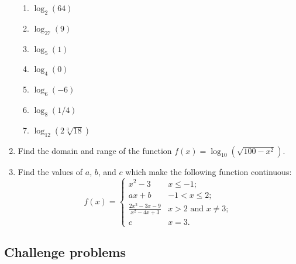 \begin{enumerate}
\begin{enumerate}
\item $\log_2(64)$
\item $\log_{27}(9)$
\item $\log_5(1)$
\item $\log_4(0)$
\item $\log_6(-6)$
\item $\log_8(1/4)$
\item $\log_{12}\left(2\sqrt[3]{18}\right)$
\end{enumerate}
\item Find the domain and range of the function $f(x) = \log_{10}\left(\sqrt{100 - x^2}\right)$.
\item Find the values of $a$, $b$, and $c$ which make the following function continuous:
\begin{equation*}
f(x) = \begin{cases} x^2 - 3 & x\leq -1; \\ ax + b & -1 < x\leq 2; \\ \frac{2x^2 - 3x - 9}{x^2 - 4x + 3} & x > 2\text{ and }x\neq 3; \\ c & x = 3. \end{cases}
\end{equation*}
\end{enumerate}


\subsection{Challenge problems}

